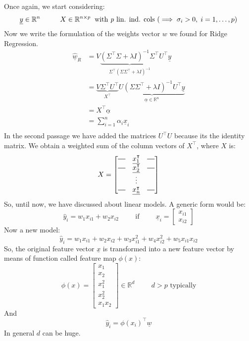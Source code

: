 \vspace{2cm}
Once again, we start considering:
\[
    \underline{y} \in \mathbb{R}^n \hspace{1cm} X \in \mathbb{R}^{n \times p} \hspace{0.2cm} \text{with \emph{p} lin. ind. cols } (\implies \sigma_i > 0, \hspace{0.1cm} i = 1, \dots, p)  
\]
Now we write the formulation of the weights vector $w$ we found for Ridge Regression. 
\[
    \begin{split}
    \underline{\hat{w}}_R &= V\underbrace{(\Sigma^\intercal \Sigma + \lambda I)^{-1} \Sigma^\intercal}_{\substack{\Sigma^\intercal(\Sigma \Sigma^\intercal + \lambda I)^{-1}}} U^\intercal \underline{y}\\
    &= \underbrace{V\Sigma^\intercal U^\intercal}_{X^\intercal} \underbrace{U(\Sigma \Sigma^\intercal + \lambda I)^{-1} U^\intercal \underline{y}}_{\underline{\alpha} \in \mathbb{R}^n}\\
    &= X^\intercal \underline{\alpha}\\
    &= \sum_{i=1}^n \alpha_i \underline{x}_i\\
    \end{split}     
\]
In the second passage we have added the matrices $U^\intercal U$ because its the identity matrix. We obtain a weighted sum of the column vectors of $X^\intercal$, where $X$ is:
\[
X = \begin{bmatrix}
    \horzbar & \underline{x_1^\intercal} & \horzbar\\
    \horzbar & \underline{x_2^\intercal} & \horzbar\\    
     & \vdots & \\
    \horzbar & \underline{x_n^\intercal} & \horzbar
\end{bmatrix}
\]
So, until now, we have discussed about linear models. A generic form would be:
\[
    \hat{y}_i = w_1x_{i1} + w_2x_{i2} \hspace{1cm} \text{if} \hspace{1cm} \underline{x}_i = \begin{bmatrix}
        x_{i1}\\
        x_{i2}
    \end{bmatrix}    
\]
Now a new model:
\[
    \hat{y}_i = w_1x_{i1} + w_2x_{i2} + w_3x_{i1}^2 + w_4x_{i2}^2 + w_5x_{i1}x_{i2}    
\]
So, the original feature vector $\underline{x}$ is transformed into a new feature vector by means of function called feature map $\phi(x)$:
\[
    \phi(x) = \begin{bmatrix}
        x_1\\
        x_2\\
        x_1^2\\
        x_2^2\\
        x_1x_2
    \end{bmatrix} \in \mathbb{R}^d \hspace{1cm} d > p \text{ typically}    
\]
And
\[
    \hat{y}_i = \phi(x_i)^\intercal \underline{w}    
\]
In general $d$ can be huge.


